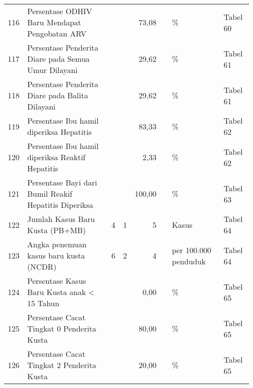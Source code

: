 \begin{small}
\begin{longtable}{rY{12em}rrrrY{5em}Y{5em}}
	                  116 & Persentase ODHIV Baru Mendapat Pengobatan ARV                                         &        &        &   73,08 &                   & \%                             & Tabel 60 \\
	117 & Persentase Penderita Diare pada Semua Umur Dilayani                                   &        &        &   29,62 &                   & \%                             & Tabel 61 \\
	                  118 & Persentase Penderita Diare pada Balita Dilayani                                       &        &        &   29,62 &                   & \%                             & Tabel 61 \\
	119 & Persentase Ibu hamil diperiksa Hepatitis                                              &        &        &   83,33 &                   & \%                             & Tabel 62 \\
	                  120 & Persentase Ibu hamil diperiksa Reaktif Hepatitis                                      &        &        &    2,33 &                   & \%                             & Tabel 62 \\
	121 & Persentase Bayi dari Bumil Reakif Hepatitis Diperiksa                                 &        &        &  100,00 &                   & \%                             & Tabel 63 \\
	                  122 & Jumlah Kasus Baru Kusta (PB+MB)                                                       &      4 &      1 &       5 &                   & Kasus                          & Tabel 64 \\
	123 & Angka penemuan kasus baru kusta (NCDR)                                                &      6 &      2 &       4 &                   & per 100.000 penduduk           & Tabel 64 \\
	                  124 & Persentase Kasus Baru Kusta anak < 15 Tahun                                           &        &        &    0,00 &                   & \%                             & Tabel 65 \\
	125 & Persentase Cacat Tingkat 0 Penderita Kusta                                            &        &        &   80,00 &                   & \%                             & Tabel 65 \\
	                  126 & Persentase Cacat Tingkat 2 Penderita Kusta                                            &        &        &   20,00 &                   & \%                             & Tabel 65 \\

\end{longtable}
\end{small}
